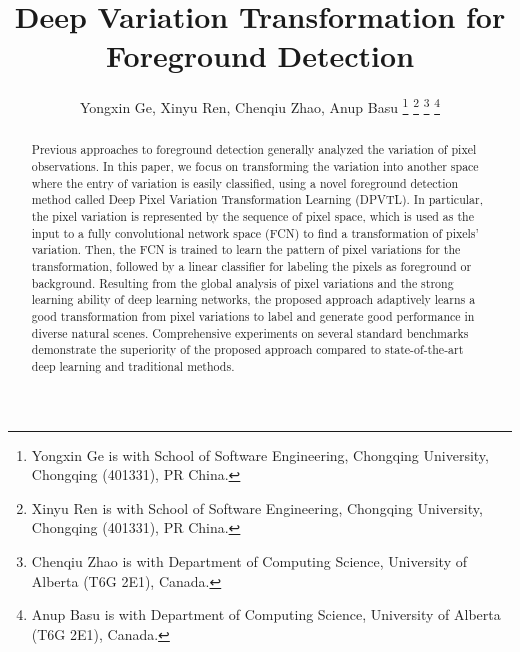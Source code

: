 \documentclass[journal]{IEEEtran}
\begin{document}
\title{Deep Variation Transformation for Foreground Detection}

\author{Yongxin Ge, 
        Xinyu Ren, 
        Chenqiu Zhao,
        Anup Basu
        \thanks{Yongxin Ge is with School of Software Engineering, Chongqing University, Chongqing (401331), PR China.}
        \thanks{Xinyu Ren is with School of Software Engineering, Chongqing University, Chongqing (401331), PR China.}
        \thanks{Chenqiu Zhao is with Department of Computing Science, University of Alberta (T6G 2E1), Canada.}
        \thanks{Anup Basu is with Department of Computing Science, University of Alberta (T6G 2E1), Canada.}
        }




\maketitle


\begin{abstract}
%
Previous approaches to foreground detection generally analyzed the variation of pixel observations.
In this paper, we focus on transforming the variation into another space where the entry of variation is easily classified, using a novel foreground detection method called Deep Pixel Variation Transformation Learning (DPVTL).
    In particular, the pixel variation is represented by the sequence of pixel space, which is used as the input to a fully convolutional network space (FCN) to find a transformation of pixels' variation.
Then, the FCN is trained to learn the pattern of pixel variations for the transformation, followed by a linear classifier for labeling the pixels as foreground or background.
%    
Resulting from the global analysis of pixel variations and the strong learning ability of deep learning networks,
the proposed approach adaptively learns a good transformation from pixel variations to label and generate good performance in diverse natural scenes.
%
Comprehensive experiments on several standard benchmarks demonstrate the superiority of the proposed approach compared to state-of-the-art deep learning and traditional methods.
%
\end{abstract}
\end{document}

